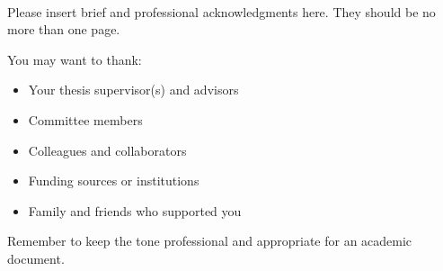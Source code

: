 

\begin{center}

\end{center}
\begin{center}

{\bf\fontsize{14pt}{14.5pt}\selectfont {Acknowledgements}}\\\vspace{1cm}
\end{center}





Please insert brief and professional acknowledgments here. They should be no more than one page.

You may want to thank:
\begin{itemize}
    \item Your thesis supervisor(s) and advisors
    \item Committee members
    \item Colleagues and collaborators
    \item Funding sources or institutions
    \item Family and friends who supported you
\end{itemize}

Remember to keep the tone professional and appropriate for an academic document.
